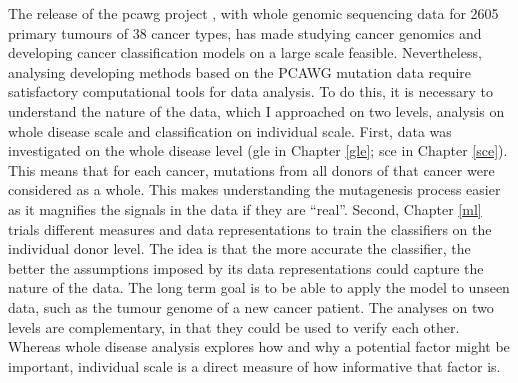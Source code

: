 The release of the \gls{pcawg} project \citep{Campbell2020}, with whole genomic sequencing data for 2605 primary tumours of 38 cancer types, has made studying cancer genomics and developing cancer classification models on a large scale feasible. Nevertheless, analysing developing methods based on the PCAWG mutation data require satisfactory computational tools for data analysis. To do this, it is necessary to understand the nature of the data, which I approached on two levels, analysis on whole disease scale and classification on individual scale. First, data was investigated on the whole disease level (\gls{gle} in Chapter \ref{gle}; \gls{sce} in Chapter \ref{sce}). This means that for each cancer, mutations from all donors of that cancer were considered as a whole. This makes understanding the mutagenesis process easier as it magnifies the signals in the data if they are ``real''. Second, Chapter \ref{ml} trials different measures and data representations to train the classifiers on the individual donor level. The idea is that the more accurate the classifier, the better the assumptions imposed by its data representations could capture the nature of the data. The long term goal is to be able to apply the model to unseen data, such as the tumour genome of a new cancer patient. The analyses on two levels are complementary, in that they could be used to verify each other. Whereas whole disease analysis explores how and why a potential factor might be important, individual scale is a direct measure of how informative that factor is.  

